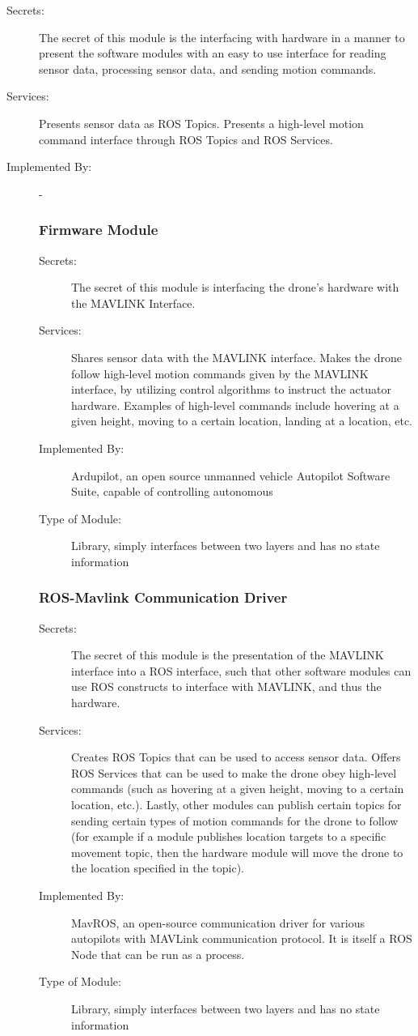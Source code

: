\documentclass[12pt, titlepage]{article}
\begin{document}
\begin{description}
\item[Secrets:] The secret of this module is the interfacing with hardware in a manner to present the software modules with an easy to use interface for reading sensor data, processing sensor data, and sending motion commands.
\item[Services:] Presents sensor data as ROS Topics. Presents a high-level motion command interface through ROS Topics and ROS Services.
\item[Implemented By:] -

\subsubsection{Firmware Module}
\label{Firmware}
\begin{description}
\item[Secrets:]The secret of this module is interfacing the drone's hardware with the MAVLINK Interface.
\item[Services:] Shares sensor data with the MAVLINK interface. Makes the drone follow high-level motion commands given by the MAVLINK interface, by utilizing control algorithms to instruct the actuator hardware. Examples of high-level commands include hovering at a given height, moving to a certain location, landing at a location, etc.
\item[Implemented By:] Ardupilot, an open source unmanned vehicle Autopilot Software Suite, capable of controlling autonomous
\item[Type of Module:] Library, simply interfaces between two layers and has no state information
\end{description}

\subsubsection{ROS-Mavlink Communication Driver}
\label{MavROS}
\begin{description}
\item[Secrets:]The secret of this module is the presentation of the MAVLINK interface into a ROS interface, such that other software modules can use ROS constructs to interface with MAVLINK, and thus the hardware.
\item[Services:] Creates ROS Topics that can be used to access sensor data. Offers ROS Services that can be used to make the drone obey high-level commands (such as hovering at a given height, moving to a certain location, etc.). Lastly, other modules can publish certain topics for sending certain types of motion commands for the drone to follow (for example if a module publishes location targets to a specific movement topic, then the hardware module will move the drone to the location specified in the topic).
\item[Implemented By:] MavROS, an open-source communication driver for various autopilots with MAVLink communication protocol. It is itself a ROS Node that can be run as a process.
\item[Type of Module:] Library, simply interfaces between two layers and has no state information
\end{description}


\end{description}
\end{document}
